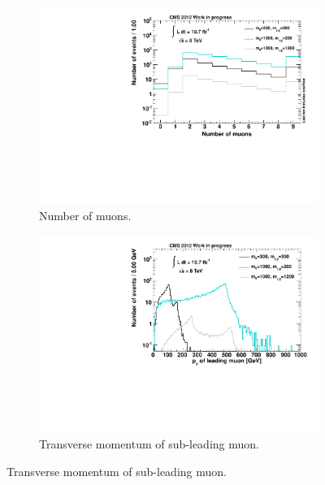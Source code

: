 \begin{figure}[!htbp]
  \centering
  \begin{subfigure}[b]{0.495\textwidth}
    \centering
    \includegraphics[width=\textwidth]{plots/muo_n.pdf}
    \caption{Number of muons.\label{fig:muo_n}}
  \end{subfigure}
  \begin{subfigure}[b]{0.495\textwidth}
    \centering
    \includegraphics[width=\textwidth]{plots/sig_muo_pt1.pdf}
    \caption{Transverse momentum of sub-leading muon.\label{fig:sig_muo_pt1}}
  \end{subfigure}
\end{figure}

